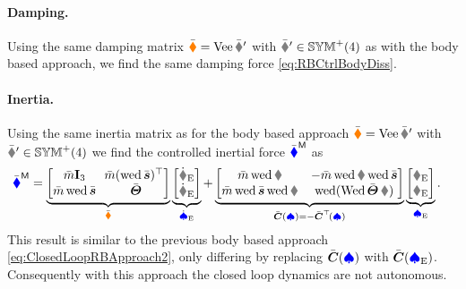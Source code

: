 
\paragraph{Damping.}
Using the same damping matrix $\sysDissMatC = \veeMatOp\bodyDissMatCp{}{}$ with $\bodyDissMatCp{}{} \in \SymMatP(4)$ as with the body based approach, we find the same damping force \eqref{eq:RBCtrlBodyDiss}. 


\paragraph{Inertia.}
Using the same inertia matrix as for the body based approach $\sysInertiaMatC = \veeMatOp\bodyInertiaMatCp{}{}$ with $\bodyInertiaMatCp{}{} \in \SymMatP(4)$ we find the controlled inertial force $\bar{\boldsymbol{\textcolor{blue}{\blacklozenge}}}^{\mathsf{M}}$ as
\begin{align}\label{eq:RBCtrlEnergy}
 \genForceInertiaC
 &= \underbrace{\begin{bmatrix} \mc \idMat[3] & \!\!\mc (\wedOp\sc)^\top \\ \mc \wedOp\sc & \Jc \end{bmatrix}}_{\sysInertiaMatC} \underbrace{\begin{bmatrix} \vEd \\ \wEd \end{bmatrix}}_{\sysVelEd}
 +  \underbrace{\begin{bmatrix} \mc \wedOp\w & -\mc \wedOp\w \wedOp\sc \\ \mc \wedOp\sc \wedOp\w & \wedOp(\wedMatOp\Jc\,\w) \end{bmatrix}}_{\ConnMatC(\sysVel) = -\ConnMatC^\top\!(\sysVel)} \underbrace{\begin{bmatrix} \vE \\ \wE \end{bmatrix}}_{\sysVelE}.
\end{align}
This result is similar to the previous body based approach \eqref{eq:ClosedLoopRBApproach2}, only differing by replacing $\bar{\boldsymbol{C}}(\boldsymbol{\textcolor{blue}{\spadesuit}})$ with $\bar{\boldsymbol{C}}(\boldsymbol{\textcolor{blue}{\spadesuit}}_{\mathrm{E}})$.
Consequently with this approach the closed loop dynamics are not autonomous.

